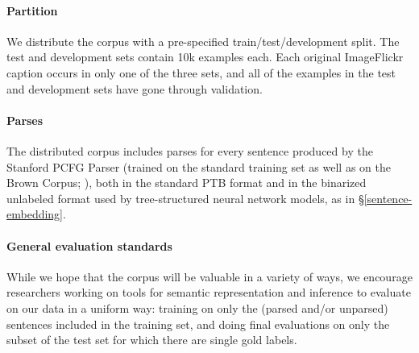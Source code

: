 \paragraph{Partition} We distribute the corpus with a pre-specified train/test/development split. The test and development sets contain 10k examples each. Each original ImageFlickr caption occurs in only one of the three sets, and all of the examples in the test and development sets have gone through validation.


\paragraph{Parses}

The distributed corpus includes parses for every sentence produced by the Stanford PCFG Parser \cite{klein2003accurate} (trained on the standard training set as well as on the Brown Corpus; \citealt{francis1979brown}), both in the standard PTB format and in the binarized unlabeled format used by tree-structured neural network models, as in \S\ref{sentence-embedding}.


\paragraph{General evaluation standards}
While we hope that the corpus will be valuable in a variety of ways, we encourage researchers working on tools for semantic representation and inference to evaluate on our data in a uniform way: training on only the (parsed and/or unparsed) sentences included in the training set, and doing final evaluations on only the subset of the test set for which there are single gold labels.
